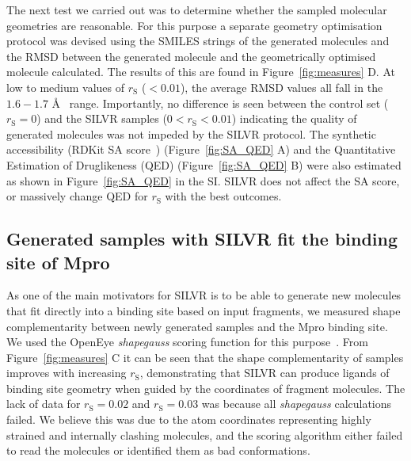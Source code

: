 \documentclass[journal=jacsat,manuscript=article]{achemso}
\begin{document}
The next test we carried out was to determine whether the sampled molecular geometries are reasonable. For this purpose a separate geometry optimisation protocol was devised using the SMILES strings of the generated molecules and the RMSD between the generated molecule and the geometrically optimised molecule calculated. The results of this are found in Figure~\ref{fig:measures} D. At low to medium values of $r_{\mathrm{S}}$ ($< 0.01$), the average RMSD values all fall in the $1.6 - 1.7$ \AA~  range. Importantly, no difference is seen between the control set ($r_{\mathrm{S}}=0$) and the SILVR samples ($0 < r_{\mathrm{S}} < 0.01$) indicating the quality of generated molecules was not impeded by the SILVR protocol. 
 The synthetic accessibility (RDKit SA score~\cite{ertl2009estimation}) (Figure~\ref{fig:SA_QED} A) and the Quantitative Estimation of Druglikeness (QED) (Figure~\ref{fig:SA_QED} B) were also estimated as shown in Figure~\ref{fig:SA_QED} in the SI. SILVR does not affect the SA score, or massively change QED for $r_{\mathrm{S}}$ with the best outcomes. 
 
\subsection{Generated samples with SILVR fit the binding site of Mpro}
As one of the main motivators for SILVR is to be able to generate new molecules that fit directly into a binding site based on input fragments, we measured shape complementarity between newly generated samples and the Mpro binding site. We used the OpenEye \textit{shapegauss} scoring function for this purpose~\cite{kelley2015posit}. From Figure~\ref{fig:measures} C it can be seen that the shape complementarity of samples improves with increasing $r_{\mathrm{S}}$, demonstrating that SILVR can produce ligands of binding site geometry when guided by the coordinates of fragment molecules. The lack of data for $r_{\mathrm{S}}=0.02$ and $r_{\mathrm{S}}=0.03$ was because all \textit{shapegauss} calculations failed. We believe this was due to the atom coordinates representing highly strained and internally clashing molecules, and the scoring algorithm either failed to read the molecules or identified them as bad conformations.
\end{document}
